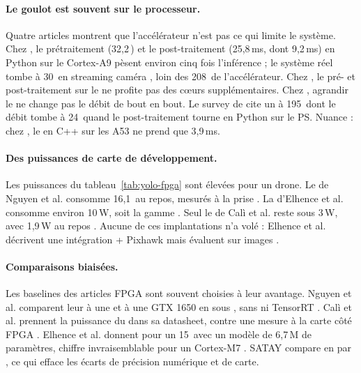 \paragraph{Le goulot est souvent sur le processeur.} Quatre articles montrent que
l'accélérateur n'est pas ce qui limite le système. Chez
\citet[Table~10]{2025-cali-optimized-implementation-yolov3-tiny-real}, le prétraitement
(32,2\,) et le post-traitement (25,8\,ms, dont  9,2\,ms) en Python sur le Cortex-A9
pèsent environ cinq fois l'inférence ; le système réel tombe à 30\, en streaming
caméra , loin des 208\, de l'accélérateur. Chez
\citet[§V-F]{2025-elhence-fpga-accelerated-yolox-enhanced-attention}, le pré- et
post-traitement sur le  ne profite pas des cœurs  supplémentaires. Chez
\citet[§IV-C]{arxiv-2607.13106-no-attention-no-problem-dpu}\pp, agrandir le  ne
change pas le débit de bout en bout. Le survey de
\citet[§VI-C]{arxiv-2509.04153-real-time-fpga-cnns-detection}\pp{} cite un  à
195\, dont le débit tombe à 24\, quand le post-traitement tourne en Python sur le
PS. Nuance : chez \citet[Table~12]{2024-nguyen-fpga-soc-implementation-yolov4-flying}, le
 en C++ sur les A53 ne prend que 3,9\,ms.

\paragraph{Des puissances de carte de développement.} Les puissances du
tableau~\ref{tab:yolo-fpga} sont élevées pour un drone. Le  de Nguyen et al.
consomme 16,1\, au repos, mesurés à la prise . La  d'Elhence et al.
consomme environ 10\,W, soit la gamme  \deduit. Seul le  de Calì et al.
reste sous 3\,W, avec 1,9\,W au repos . Aucune de ces implantations n'a volé :
Elhence et al. décrivent une intégration  + Pixhawk mais évaluent sur images
.

\paragraph{Comparaisons biaisées.} Les baselines des articles FPGA sont souvent choisies
à leur avantage. Nguyen et al. comparent leur  à une  et à une GTX 1650 en
 sous , sans  ni TensorRT . Calì et al. prennent la puissance du
 dans sa datasheet, contre une mesure à la carte côté FPGA .
Elhence et al. donnent pour un  15\, avec un modèle de 6,7\,M de paramètres,
chiffre invraisemblable pour un Cortex-M7 \deduit{} . SATAY compare en  par
, ce qui efface les écarts de précision numérique et de carte.

